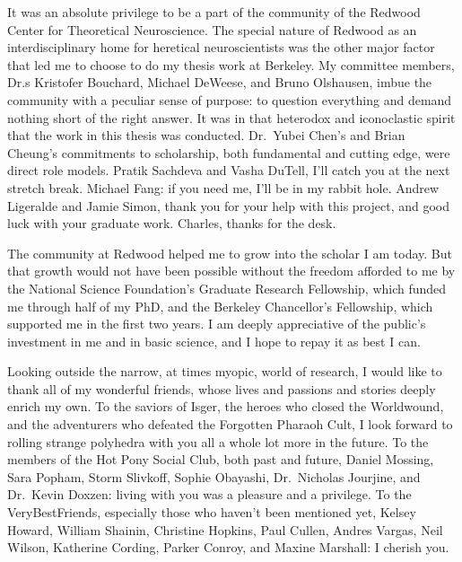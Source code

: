 \begin{frontmatter}
\begin{acknowledgements}
	It was an absolute privilege to
	be a part of the community of the
	Redwood Center for Theoretical Neuroscience.
	The special nature of Redwood as an
	interdisciplinary home for heretical
	neuroscientists was the other major factor
	that led me to choose to do my thesis work at Berkeley.
	My committee members,
	Dr.s Kristofer Bouchard,
	Michael DeWeese,
	and Bruno Olshausen,
	imbue the community with a peculiar sense of purpose:
	to question everything and demand nothing short
	of the right answer.
	It was in that heterodox and iconoclastic spirit that
	the work in this thesis was conducted.
	Dr.\ Yubei Chen's and Brian Cheung's commitments
	to scholarship, both fundamental and cutting edge,
	were direct role models.
	Pratik Sachdeva and Vasha DuTell,
	I'll catch you at the next stretch break.
	Michael Fang: if you need me,
	I'll be in my rabbit hole.
	Andrew Ligeralde and Jamie Simon,
	thank you for your help with this project,
	and good luck with your graduate work.
	Charles, thanks for the desk.

	The community at Redwood helped me
	to grow into the scholar I am today.
	But that growth would not have been possible
	without the freedom afforded to me by the
	National Science Foundation's
	Graduate Research Fellowship,
	which funded me through half of my PhD,
	and the Berkeley Chancellor's Fellowship,
	which supported me in the first two years.
	I am deeply appreciative
	of the public's investment in me
	and in basic science,
	and I hope to repay it as best I can.

	Looking outside the narrow, at times myopic,
	world of research,
	I would like to thank all of my wonderful friends,
	whose lives and passions and stories
	deeply enrich my own.
	To the saviors of Isger,
	the heroes who closed the Worldwound,
	and the adventurers who defeated the Forgotten Pharaoh Cult,
	I look forward to rolling strange polyhedra
	with you all a whole lot more in the future.
	To the members of the Hot Pony Social Club,
	both past and future,
	Daniel Mossing, Sara Popham, Storm Slivkoff,
	Sophie Obayashi, Dr.\ Nicholas Jourjine,
	and Dr.\ Kevin Doxzen:
	living with you was a pleasure and a privilege.
	To the VeryBestFriends,
	especially those who haven't been mentioned yet,
	Kelsey Howard, William Shainin, Christine Hopkins,
	Paul Cullen, Andres Vargas, Neil Wilson, Katherine Cording,
	Parker Conroy, and Maxine Marshall:
	I cherish you.

\end{acknowledgements}

\end{frontmatter}

